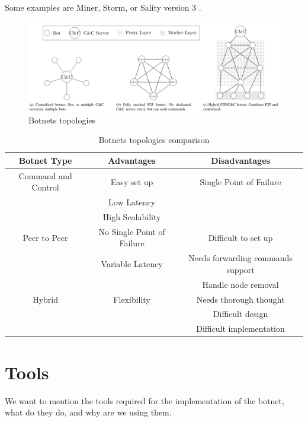 \documentclass[11pt, a4paper,twoside]{tesi_upf}
\begin{document}
Some examples are Miner, Storm, or Sality version 3 \cite{botnets}.

\begin{figure}
    \includegraphics[width=\linewidth]{images/botnets.png}
    \caption{Botnets topologies
    \cite{botnets}}
    \label{fig:botnets-topologies}
\end{figure}

\begin{table}
    \resizebox{\textwidth}{!} {
        \begin{tabular}{||c | c | c||}
            \hline
            Botnet Type & Advantages & Disadvantages \\ [0.5ex] 
            \hline\hline
            Command and Control & Easy set up & Single Point of Failure
            \\
            & Low Latency & \\
            & High Scalability & \\
            \hline
            Peer to Peer & No Single Point of Failure & Difficult to set up \\
            &  Variable Latency & Needs forwarding commands support\\
            & & Handle node removal\\
            \hline
            Hybrid & Flexibility & Needs thorough thought\\
            & & Difficult design\\
            & & Difficult implementation\\
            \hline
        \end{tabular}
    }
    \caption{Botnets topologies comparison}
\end{table}

\chapter{Tools}

We want to mention the tools required for the implementation of the botnet, what do they do, and why are we using them.
\end{document}
